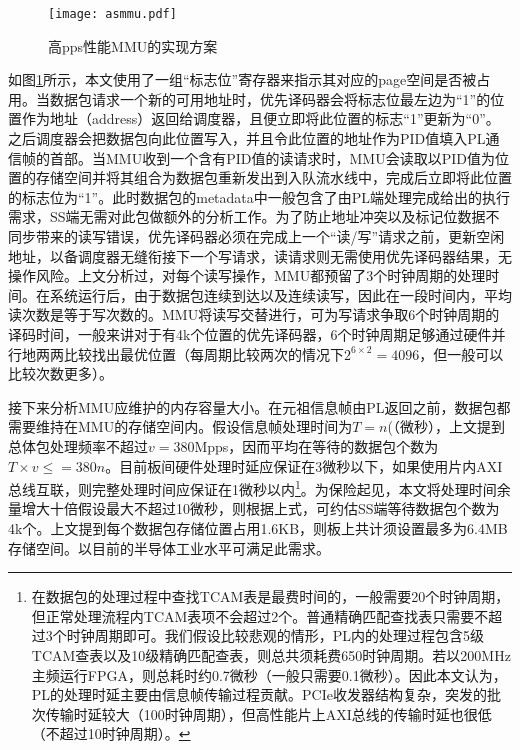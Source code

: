 \begin{figure}[!ht]
	\centering 
	\texttt{[image: asmmu.pdf]}
	\caption{高pps性能MMU的实现方案} \label{fig:asmmu}
\end{figure}

如图\ref{fig:asmmu}所示，本文使用了一组“标志位”寄存器来指示其对应的page空间是否被占用。当数据包请求一个新的可用地址时，优先译码器会将标志位最左边为“1”的位置作为地址（address）返回给调度器，且便立即将此位置的标志“1”更新为“0”。之后调度器会把数据包向此位置写入，并且令此位置的地址作为PID值填入PL通信帧的首部。当MMU收到一个含有PID值的读请求时，MMU会读取以PID值为位置的存储空间并将其组合为数据包重新发出到入队流水线中，完成后立即将此位置的标志位为“1”。此时数据包的metadata中一般包含了由PL端处理完成给出的执行需求，SS端无需对此包做额外的分析工作。为了防止地址冲突以及标记位数据不同步带来的读写错误，优先译码器必须在完成上一个“读/写”请求之前，更新空闲地址，以备调度器无缝衔接下一个写请求，读请求则无需使用优先译码器结果，无操作风险。上文分析过，对每个读写操作，MMU都预留了3个时钟周期的处理时间。在系统运行后，由于数据包连续到达以及连续读写，因此在一段时间内，平均读次数是等于写次数的。MMU将读写交替进行，可为写请求争取6个时钟周期的译码时间，一般来讲对于有4k个位置的优先译码器，6个时钟周期足够通过硬件并行地两两比较找出最优位置（每周期比较两次的情况下$2^{6\times2}=4096$，但一般可以比较次数更多）。

接下来分析MMU应维护的内存容量大小。在元祖信息帧由PL返回之前，数据包都需要维持在MMU的存储空间内。假设信息帧处理时间为$T=n$(（微秒），上文提到总体包处理频率不超过$v=$380Mpps，因而平均在等待的数据包个数为$T \times v \leq =380n$。目前板间硬件处理时延应保证在3微秒以下，如果使用片内AXI总线互联，则完整处理时间应保证在1微秒以内\footnote{在数据包的处理过程中查找TCAM表是最费时间的，一般需要20个时钟周期，但正常处理流程内TCAM表项不会超过2个。普通精确匹配查找表只需要不超过3个时钟周期即可。我们假设比较悲观的情形，PL内的处理过程包含5级TCAM查表以及10级精确匹配查表，则总共须耗费650时钟周期。若以200MHz主频运行FPGA，则总耗时约0.7微秒（一般只需要0.1微秒）。因此本文认为，PL的处理时延主要由信息帧传输过程贡献。PCIe收发器结构复杂，突发的批次传输时延较大（100时钟周期），但高性能片上AXI总线的传输时延也很低（不超过10时钟周期）。}。为保险起见，本文将处理时间余量增大十倍假设最大不超过10微秒，则根据上式，可约估SS端等待数据包个数为4k个。上文提到每个数据包存储位置占用1.6KB，则板上共计须设置最多为6.4MB存储空间。以目前的半导体工业水平可满足此需求。 





